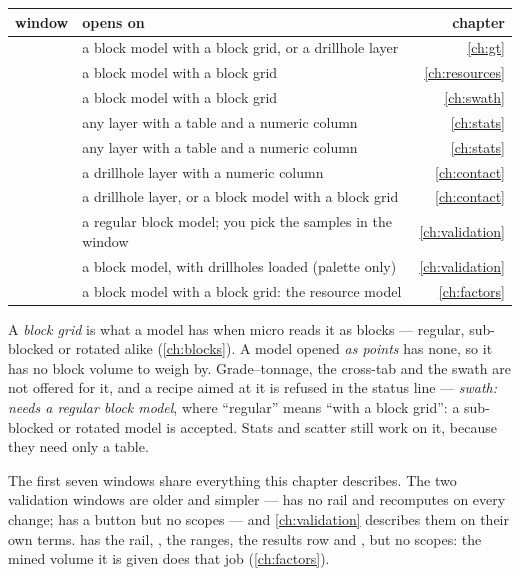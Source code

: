 \medskip
\begin{tabularx}{\linewidth}{@{}lMD@{}}\toprule
window & opens on & chapter \\ \midrule
{} & a block model with a block grid, or a drillhole layer & \cref{ch:gt} \\
 & a block model with a block grid & \cref{ch:resources} \\
 & a block model with a block grid & \cref{ch:swath} \\
 & any layer with a table and a numeric column & \cref{ch:stats} \\
 & any layer with a table and a numeric column & \cref{ch:stats} \\
 & a drillhole layer with a numeric column & \cref{ch:contact} \\
 & a drillhole layer, or a block model with a block grid & \cref{ch:contact} \\
 & a regular block model; you pick the samples in the window & \cref{ch:validation} \\
 & a block model, with drillholes loaded (palette only) & \cref{ch:validation} \\
 & a block model with a block grid: the resource model & \cref{ch:factors} \\ \bottomrule
\end{tabularx}
\medskip

A \emph{block grid} is what a model has when micro reads it as blocks — regular, sub-blocked or rotated alike (\cref{ch:blocks}). A model opened \emph{as points} has none, so it has no block volume to weigh by. Grade–tonnage, the cross-tab and the swath are not offered for it, and a recipe aimed at it is refused in the status line — \emph{swath: needs a regular block model}, where “regular” means “with a block grid”: a sub-blocked or rotated model is accepted. Stats and scatter still work on it, because they need only a table.

The first seven windows share everything this chapter describes. The two validation windows are older and simpler —  has no rail and recomputes on every change;  has a  button but no scopes — and \cref{ch:validation} describes them on their own terms.  has the rail, , the ranges, the results row and , but no scopes: the mined volume it is given does that job (\cref{ch:factors}).

